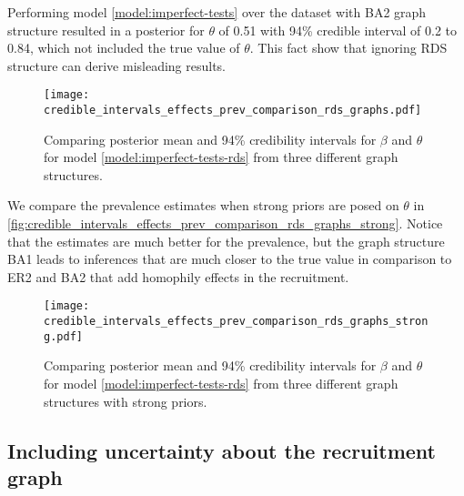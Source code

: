 Performing model \eqref{model:imperfect-tests} over the dataset with BA2 graph
structure resulted in a posterior for $\theta$ of 0.51 with 94\% credible
interval of 0.2 to 0.84, which not included the true value of $\theta$. This
fact show that ignoring RDS structure can derive misleading results. 

\begin{figure}
  \centering
  \caption{\label{fig:credible_intervals_effects_prev_comparison_rds_graphs}Comparing
  posterior mean and 94\% credibility intervals for $\beta$ and $\theta$ for model
  \eqref{model:imperfect-tests-rds} from three different graph structures.}
  \texttt{[image: credible\_intervals\_effects\_prev\_comparison\_rds\_graphs.pdf]}
\end{figure}

We compare the prevalence estimates when strong priors are posed on $\theta$
in \autoref{fig:credible_intervals_effects_prev_comparison_rds_graphs_strong}.
Notice that the estimates are much better for the prevalence, but the graph structure
BA1 leads to inferences that are much closer to the true value in comparison
to ER2 and BA2 that add homophily effects in the recruitment.

\begin{figure}
  \centering
  \caption{\label{fig:credible_intervals_effects_prev_comparison_rds_graphs_strong}Comparing
  posterior mean and 94\% credibility intervals for $\beta$ and $\theta$ for model
  \eqref{model:imperfect-tests-rds} from three different graph structures with
  strong priors.}
  \texttt{[image: credible\_intervals\_effects\_prev\_comparison\_rds\_graphs\_strong.pdf]}
\end{figure}

\subsection{Including uncertainty about the recruitment graph}

